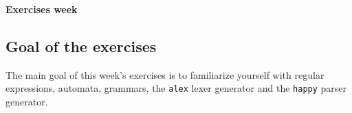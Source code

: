 \documentclass[a4paper]{article}
\begin{document}
\begin{center}
{\Large\bf Exercises week }\\[1ex]
\end{center}

\subsection*{Goal of the exercises}

The main goal of this week's exercises is to familiarize yourself with
regular expressions, automata, grammars, the \texttt{alex} lexer
generator and the \texttt{happy} parser generator.



%
%
\end{document}
